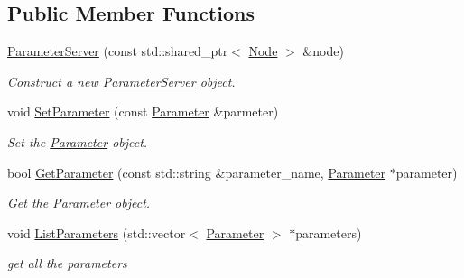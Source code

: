 \subsection*{Public Member Functions}
\begin{DoxyCompactItemize}
\item 
\hyperlink{classapollo_1_1cyber_1_1ParameterServer_ac976496689a128ce5db8059aa1ca9e54}{Parameter\-Server} (const std\-::shared\-\_\-ptr$<$ \hyperlink{classapollo_1_1cyber_1_1Node}{Node} $>$ \&node)
\begin{DoxyCompactList}\small\item\em Construct a new \hyperlink{classapollo_1_1cyber_1_1ParameterServer}{Parameter\-Server} object. \end{DoxyCompactList}\item 
void \hyperlink{classapollo_1_1cyber_1_1ParameterServer_ad54689c4cf62b72601a1fed489fa05b3}{Set\-Parameter} (const \hyperlink{classapollo_1_1cyber_1_1Parameter}{Parameter} \&parmeter)
\begin{DoxyCompactList}\small\item\em Set the \hyperlink{classapollo_1_1cyber_1_1Parameter}{Parameter} object. \end{DoxyCompactList}\item 
bool \hyperlink{classapollo_1_1cyber_1_1ParameterServer_aaf09c1da116708008070cfb1e306988c}{Get\-Parameter} (const std\-::string \&parameter\-\_\-name, \hyperlink{classapollo_1_1cyber_1_1Parameter}{Parameter} $\ast$parameter)
\begin{DoxyCompactList}\small\item\em Get the \hyperlink{classapollo_1_1cyber_1_1Parameter}{Parameter} object. \end{DoxyCompactList}\item 
void \hyperlink{classapollo_1_1cyber_1_1ParameterServer_a49103f681e732d45eba0c6d4fe57ca34}{List\-Parameters} (std\-::vector$<$ \hyperlink{classapollo_1_1cyber_1_1Parameter}{Parameter} $>$ $\ast$parameters)
\begin{DoxyCompactList}\small\item\em get all the parameters \end{DoxyCompactList}\end{DoxyCompactItemize}
